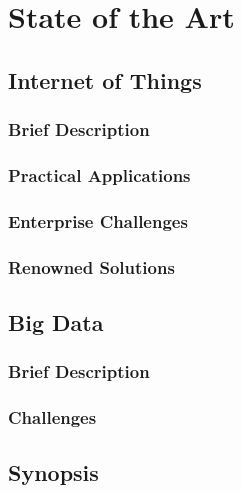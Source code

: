 
\chapter{State of the Art} %
\label{chap:Chapter2} %


\section{Internet of Things}

\subsection{Brief Description}

\subsection{Practical Applications}

\subsection{Enterprise Challenges}

\subsection{Renowned Solutions}

\section{Big Data}

\subsection{Brief Description}

\subsection{Challenges}

\section{Synopsis}